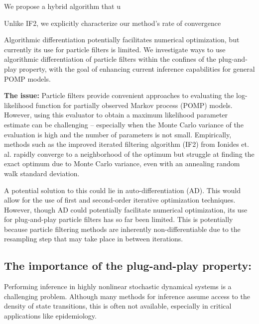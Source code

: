 \documentclass[9pt,twocolumn,twoside]{pnas-new}
\begin{document}


We propose a hybrid algorithm that u

Unlike IF2, we explicitly characterize our method's rate of convergence



Algorithmic differentiation potentially facilitates numerical optimization, but currently its use for particle filters is limited. We investigate ways to use algorithmic differentiation of particle filters within the confines of the plug-and-play property, with the goal of enhancing current inference capabilities for general POMP models.


\textbf{The issue:} Particle filters provide convenient approaches to evaluating the log-likelihood function for partially observed Markov process (POMP) models. However, using this evaluator to obtain a maximum likelihood parameter estimate can be challenging -- especially when the Monte Carlo variance of the evaluation is high and the number of parameters is not small. Empirically, methods such as the improved iterated filtering algorithm (IF2) from Ionides et. al. \cite{Ionides_infpomp} rapidly converge to a neighborhood of the optimum but struggle at finding the exact optimum due to Monte Carlo variance, even with an annealing random walk standard deviation. 

A potential solution to this could lie in auto-differentiation (AD). This would allow for the use of first and second-order iterative optimization techniques. However, though AD could potentially facilitate numerical optimization, its use for plug-and-play particle filters has so far been limited. This is potentially because particle filtering methods are inherently non-differentiable due to the resampling step that may take place in between iterations. 

\subsection*{The importance of the plug-and-play property:} Performing inference in highly nonlinear stochastic dynamical systems is a challenging problem. Although many methods for inference assume access to the density of state transitions, this is often not available, especially in critical applications like epidemiology.
\end{document}
